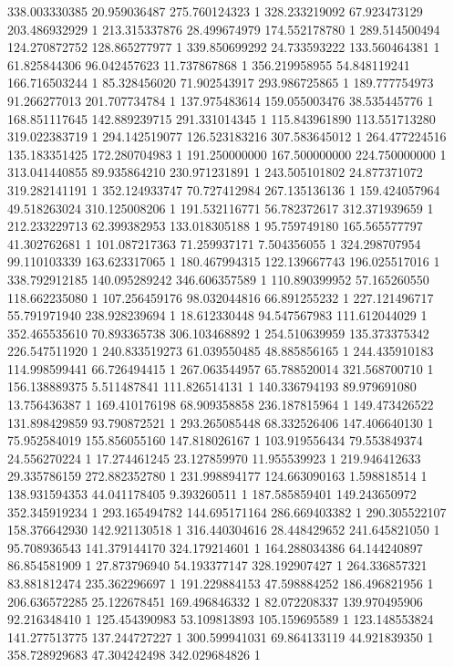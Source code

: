338.003330385	20.959036487	275.760124323	1
328.233219092	67.923473129	203.486932929	1
213.315337876	28.499674979	174.552178780	1
289.514500494	124.270872752	128.865277977	1
339.850699292	24.733593222	133.560464381	1
61.825844306	96.042457623	11.737867868	1
356.219958955	54.848119241	166.716503244	1
85.328456020	71.902543917	293.986725865	1
189.777754973	91.266277013	201.707734784	1
137.975483614	159.055003476	38.535445776	1
168.851117645	142.889239715	291.331014345	1
115.843961890	113.551713280	319.022383719	1
294.142519077	126.523183216	307.583645012	1
264.477224516	135.183351425	172.280704983	1
191.250000000	167.500000000	224.750000000	1
313.041440855	89.935864210	230.971231891	1
243.505101802	24.877371072	319.282141191	1
352.124933747	70.727412984	267.135136136	1
159.424057964	49.518263024	310.125008206	1
191.532116771	56.782372617	312.371939659	1
212.233229713	62.399382953	133.018305188	1
95.759749180	165.565577797	41.302762681	1
101.087217363	71.259937171	7.504356055	1
324.298707954	99.110103339	163.623317065	1
180.467994315	122.139667743	196.025517016	1
338.792912185	140.095289242	346.606357589	1
110.890399952	57.165260550	118.662235080	1
107.256459176	98.032044816	66.891255232	1
227.121496717	55.791971940	238.928239694	1
18.612330448	94.547567983	111.612044029	1
352.465535610	70.893365738	306.103468892	1
254.510639959	135.373375342	226.547511920	1
240.833519273	61.039550485	48.885856165	1
244.435910183	114.998599441	66.726494415	1
267.063544957	65.788520014	321.568700710	1
156.138889375	5.511487841	111.826514131	1
140.336794193	89.979691080	13.756436387	1
169.410176198	68.909358858	236.187815964	1
149.473426522	131.898429859	93.790872521	1
293.265085448	68.332526406	147.406640130	1
75.952584019	155.856055160	147.818026167	1
103.919556434	79.553849374	24.556270224	1
17.274461245	23.127859970	11.955539923	1
219.946412633	29.335786159	272.882352780	1
231.998894177	124.663090163	1.598818514	1
138.931594353	44.041178405	9.393260511	1
187.585859401	149.243650972	352.345919234	1
293.165494782	144.695171164	286.669403382	1
290.305522107	158.376642930	142.921130518	1
316.440304616	28.448429652	241.645821050	1
95.708936543	141.379144170	324.179214601	1
164.288034386	64.144240897	86.854581909	1
27.873796940	54.193377147	328.192907427	1
264.336857321	83.881812474	235.362296697	1
191.229884153	47.598884252	186.496821956	1
206.636572285	25.122678451	169.496846332	1
82.072208337	139.970495906	92.216348410	1
125.454390983	53.109813893	105.159695589	1
123.148553824	141.277513775	137.244727227	1
300.599941031	69.864133119	44.921839350	1
358.728929683	47.304242498	342.029684826	1
